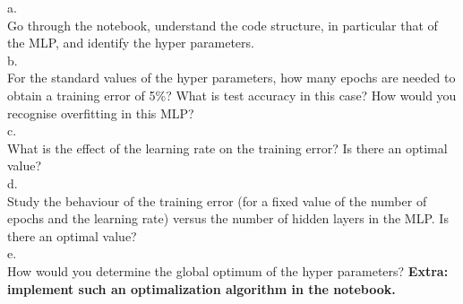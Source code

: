 \documentclass[10pt]{article}
\begin{document}
\noindent a.   \\
\noindent  Go through the notebook, understand the code structure, in 
particular that of the MLP,   and identify the hyper parameters.     \\

\noindent b.   \\
\noindent  For the standard values of the hyper parameters, how many epochs 
are needed to obtain a training error of 5\%?  What is test accuracy in this case?
How would you recognise overfitting in this MLP?  \\

\noindent c.   \\
\noindent  What is the effect of the learning rate on the training error?  
Is there an optimal value? \\ 

\noindent d. \\
\noindent  Study the behaviour of the training error (for a fixed value of 
the number of epochs and the learning rate) versus the number of hidden 
layers in the MLP. Is there an optimal value?  \\ 

\noindent e.  \\
\noindent  How would you determine the global optimum of the hyper parameters?  
{\bf Extra: implement such an optimalization algorithm in the notebook.}  \\ \\  
\end{document}
